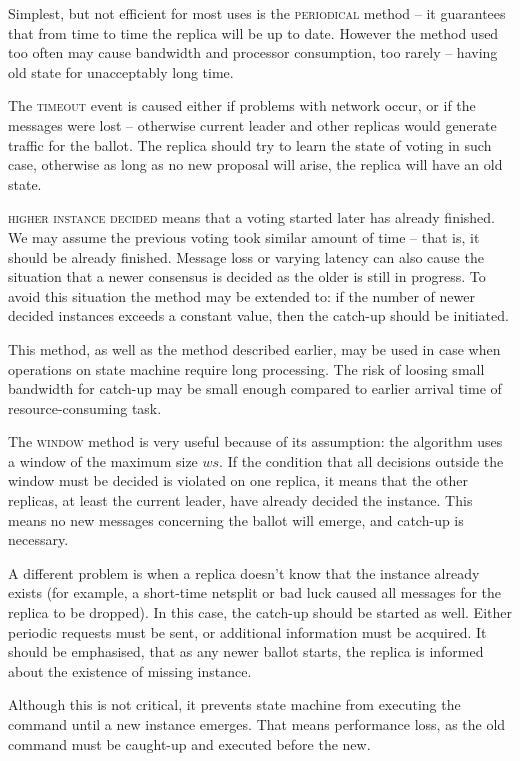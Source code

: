 Simplest, but not efficient for most uses is the \textsc{periodical} method -- it guarantees that from time to time the replica will be up to date.
However the method used too often may cause bandwidth and processor consumption, too rarely -- having old state for unacceptably long time.

The \textsc{timeout} event is caused either if problems with network occur, or if the \accept messages were lost -- otherwise current leader and other replicas would generate traffic for the ballot. The replica should try to learn the state of voting in such case, otherwise as long as no new proposal will arise, the replica will have an old state.

\textsc{higher instance decided} means that a voting started later has already finished. We may assume the previous voting took similar amount of time -- that is, it should be already finished. Message loss or varying latency can also cause the situation that a newer consensus is decided as the older is still in progress. To avoid this situation the method may be extended to: if the number of newer decided instances exceeds a constant value, then the catch-up should be initiated.

This method, as well as the method described earlier, may be used in case when operations on state machine require long processing. The risk of loosing small bandwidth for catch-up may be small enough compared to earlier arrival time of resource-consuming task.

The \textsc{window} method is very useful because of its assumption: the algorithm uses a window of the maximum size $ws$. If the condition that all decisions outside the window must be decided is violated on one replica, it means that the other replicas, at least the current leader, have already decided the instance. This means no new messages concerning the ballot will emerge, and catch-up is necessary.

A different problem is when a replica doesn't know that the instance already exists (for example, a short-time netsplit or bad luck caused all messages for the replica to be dropped). In this case, the catch-up should be started as well. 
Either periodic requests must be sent, or additional information must be acquired. It should be emphasised, that as any newer ballot starts, the replica is informed about the existence of missing instance. 

Although this is not critical, it prevents state machine from executing the command until a new instance emerges. That means performance loss, as the old command must be caught-up and executed before the new.

